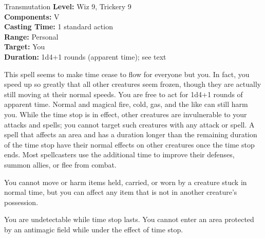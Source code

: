 {Transmutation}
{
	\textbf{Level:}
	Wiz 9, Trickery 9\\
	\textbf{Components:}
	V\\
	\textbf{Casting Time:}
	1 standard action\\
	\textbf{Range:}
	Personal\\
	\textbf{Target:}
	You\\
	\textbf{Duration:}
	1d4+1 rounds (apparent time); see text\\
}
{
	This spell seems to make time cease to flow for everyone but you. In fact, you speed up so greatly that all other creatures seem frozen, though they are actually still moving at their normal speeds. You are free to act for 1d4+1 rounds of apparent time. Normal and magical fire, cold, gas, and the like can still harm you. While the time stop is in effect, other creatures are invulnerable to your attacks and spells; you cannot target such creatures with any attack or spell. A spell that affects an area and has a duration longer than the remaining duration of the time stop have their normal effects on other creatures once the time stop ends. Most spellcasters use the additional time to improve their defenses, summon allies, or flee from combat.

	You cannot move or harm items held, carried, or worn by a creature stuck in normal time, but you can affect any item that is not in another creature's possession.

	You are undetectable while time stop lasts. You cannot enter an area protected by an antimagic field while under the effect of time stop.

}
